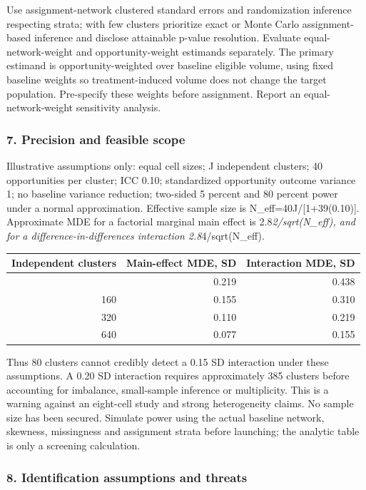 \documentclass[
  11pt,
]{article}
\begin{document}
Use assignment-network clustered standard errors and randomization
inference respecting strata; with few clusters prioritize exact or Monte
Carlo assignment-based inference and disclose attainable p-value
resolution. Evaluate equal-network-weight and opportunity-weight
estimands separately. The primary estimand is opportunity-weighted over
baseline eligible volume, using fixed baseline weights so
treatment-induced volume does not change the target population.
Pre-specify these weights before assignment. Report an
equal-network-weight sensitivity analysis.

\subsubsection{7. Precision and feasible
scope}\label{precision-and-feasible-scope}

Illustrative assumptions only: equal cell sizes; J independent clusters;
40 opportunities per cluster; ICC 0.10; standardized opportunity outcome
variance 1; no baseline variance reduction; two-sided 5 percent and 80
percent power under a normal approximation. Effective sample size is
N\_eff=40J/{[}1+39(0.10){]}. Approximate MDE for a factorial marginal
main effect is 2.8\emph{2/sqrt(N\_eff), and for a
difference-in-differences interaction 2.8}4/sqrt(N\_eff).

\begin{longtable}[]{@{}rrr@{}}
\toprule\noalign{}
Independent clusters & Main-effect MDE, SD & Interaction MDE, SD \\
\midrule\noalign{}
\endhead
\bottomrule\noalign{}
\endlastfoot
80 & 0.219 & 0.438 \\
160 & 0.155 & 0.310 \\
320 & 0.110 & 0.219 \\
640 & 0.077 & 0.155 \\
\end{longtable}

Thus 80 clusters cannot credibly detect a 0.15 SD interaction under
these assumptions. A 0.20 SD interaction requires approximately 385
clusters before accounting for imbalance, small-sample inference or
multiplicity. This is a warning against an eight-cell study and strong
heterogeneity claims. No sample size has been secured. Simulate power
using the actual baseline network, skewness, missingness and assignment
strata before launching; the analytic table is only a screening
calculation.

\subsubsection{8. Identification assumptions and
threats}\label{identification-assumptions-and-threats}
\end{document}
